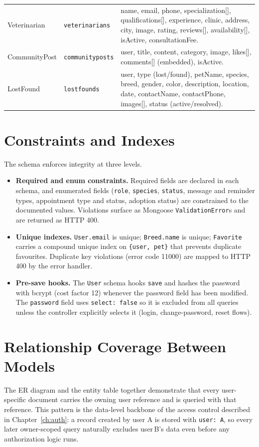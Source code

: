 \begin{center}
\begin{longtable}{@{}p{3.0cm}p{3.3cm}p{8.3cm}@{}}
Veterinarian & \texttt{veterinarians} & name, email, phone, specialization[],
qualifications[], experience, clinic, address, city, image, rating, reviews[],
availability[], isActive, consultationFee. \\
CommunityPost & \texttt{communityposts} & user, title, content, category, image,
likes[], comments[] (embedded), isActive. \\
LostFound & \texttt{lostfounds} & user, type (lost/found), petName, species,
breed, gender, color, description, location, date, contactName, contactPhone,
images[], status (active/resolved). \\
\bottomrule
\end{longtable}
\end{center}

\section{Constraints and Indexes}

The schema enforces integrity at three levels.

\begin{itemize}
    \item \textbf{Required and enum constraints.} Required fields are declared in
    each schema, and enumerated fields (\texttt{role}, \texttt{species},
    \texttt{status}, message and reminder types, appointment type and status,
    adoption status) are constrained to the documented values. Violations
    surface as Mongoose \texttt{ValidationError}s and are returned as HTTP 400.
    \item \textbf{Unique indexes.} \texttt{User.email} is unique;
    \texttt{Breed.name} is unique; \texttt{Favorite} carries a compound unique
    index on \texttt{\{user, pet\}} that prevents duplicate favourites. Duplicate
    key violations (error code 11000) are mapped to HTTP 400 by the error
    handler.
    \item \textbf{Pre-save hooks.} The \texttt{User} schema hooks \texttt{save}
    and hashes the password with bcrypt (cost factor 12) whenever the password
    field has been modified. The \texttt{password} field uses \texttt{select:
    false} so it is excluded from all queries unless the controller explicitly
    selects it (login, change-password, reset flows).
\end{itemize}

\section{Relationship Coverage Between Models}

The ER diagram and the entity table together demonstrate that every
user-specific document carries the owning user reference and is queried with
that reference. This pattern is the data-level backbone of the access control
described in Chapter~\ref{ch:auth}: a record created by user A is stored with
\texttt{user: A}, so every later owner-scoped query naturally excludes user\,B's
data even before any authorization logic runs.